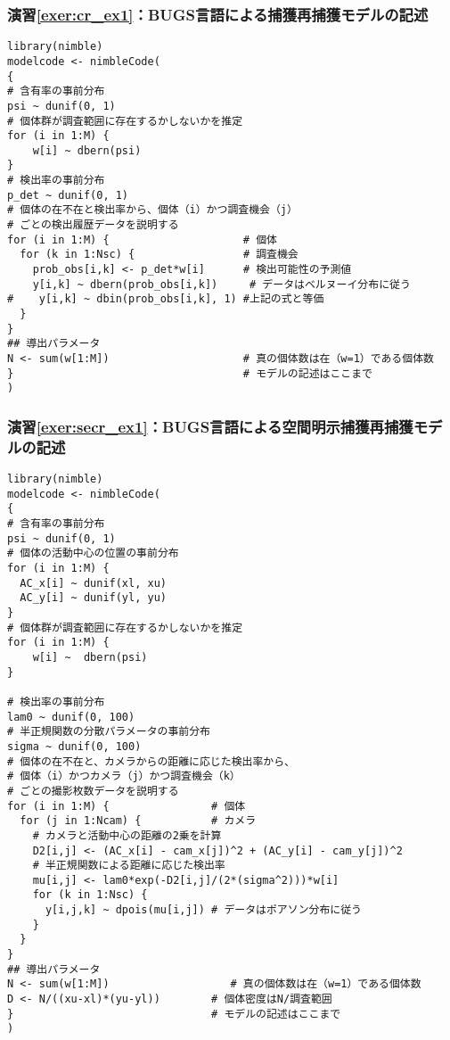     \subsubsection*{演習\ref{exer:cr_ex1}：BUGS言語による捕獲再捕獲モデルの記述}
\begin{verbatim}
library(nimble)
modelcode <- nimbleCode(
{
# 含有率の事前分布
psi ~ dunif(0, 1)
# 個体群が調査範囲に存在するかしないかを推定
for (i in 1:M) {
    w[i] ~ dbern(psi)
}
# 検出率の事前分布
p_det ~ dunif(0, 1)
# 個体の在不在と検出率から、個体（i）かつ調査機会（j）
# ごとの検出履歴データを説明する
for (i in 1:M) {                     # 個体
  for (k in 1:Nsc) {                 # 調査機会
    prob_obs[i,k] <- p_det*w[i]      # 検出可能性の予測値
    y[i,k] ~ dbern(prob_obs[i,k])     # データはベルヌーイ分布に従う
#    y[i,k] ~ dbin(prob_obs[i,k], 1) #上記の式と等価
  }
}
## 導出パラメータ
N <- sum(w[1:M])                     # 真の個体数は在（w=1）である個体数
}                                    # モデルの記述はここまで
)
\end{verbatim}

    \subsubsection*{演習\ref{exer:secr_ex1}：BUGS言語による空間明示捕獲再捕獲モデルの記述}
\begin{verbatim}
library(nimble)
modelcode <- nimbleCode(
{
# 含有率の事前分布
psi ~ dunif(0, 1)
# 個体の活動中心の位置の事前分布
for (i in 1:M) {
  AC_x[i] ~ dunif(xl, xu)
  AC_y[i] ~ dunif(yl, yu)
}
# 個体群が調査範囲に存在するかしないかを推定
for (i in 1:M) {
    w[i] ~  dbern(psi)
}

# 検出率の事前分布
lam0 ~ dunif(0, 100)
# 半正規関数の分散パラメータの事前分布
sigma ~ dunif(0, 100)
# 個体の在不在と、カメラからの距離に応じた検出率から、
# 個体（i）かつカメラ（j）かつ調査機会（k）
# ごとの撮影枚数データを説明する
for (i in 1:M) {                # 個体
  for (j in 1:Ncam) {           # カメラ
    # カメラと活動中心の距離の2乗を計算
    D2[i,j] <- (AC_x[i] - cam_x[j])^2 + (AC_y[i] - cam_y[j])^2
    # 半正規関数による距離に応じた検出率
    mu[i,j] <- lam0*exp(-D2[i,j]/(2*(sigma^2)))*w[i]
    for (k in 1:Nsc) {
      y[i,j,k] ~ dpois(mu[i,j]) # データはポアソン分布に従う
    }
  }
}
## 導出パラメータ
N <- sum(w[1:M])                   # 真の個体数は在（w=1）である個体数
D <- N/((xu-xl)*(yu-yl))        # 個体密度はN/調査範囲
}                               # モデルの記述はここまで
)
\end{verbatim}
